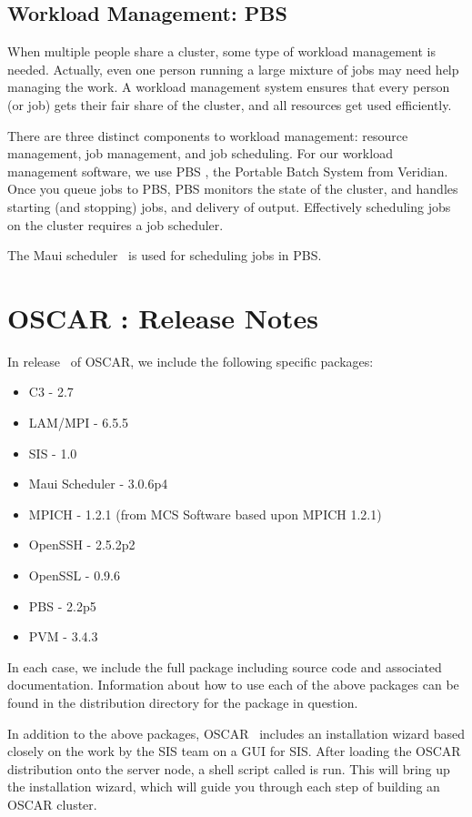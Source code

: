 \documentclass[letterpaper,11pt]{article}
\begin{document}
\subsection{Workload Management: PBS}
When multiple people share a cluster, some type of workload management
is needed.  Actually, even one person running a large mixture of jobs
may need help managing the work.  A workload management system ensures
that every person (or job) gets their fair share of the cluster, and
all resources get used efficiently.

There are three distinct components to workload management: resource
management, job management, and job scheduling.  For our workload
management software, we use PBS \cite{OpenPBS}, the Portable Batch System
from Veridian.  Once you queue jobs to PBS, PBS monitors the state of
the cluster, and handles starting (and stopping) jobs, and delivery of
output.  Effectively scheduling jobs on the cluster requires a job
scheduler.

The Maui scheduler~\cite{MAUI} is used for scheduling jobs in PBS.

\section{OSCAR \oscarversion: Release Notes}
In release \oscarversion\ of OSCAR, we include the following specific
packages:
\begin{itemize}
        \item C3 - 2.7
        \item LAM/MPI - 6.5.5
        \item SIS - 1.0
        \item Maui Scheduler - 3.0.6p4
        \item MPICH - 1.2.1 (from MCS Software based upon MPICH 1.2.1)
        \item OpenSSH - 2.5.2p2
        \item OpenSSL - 0.9.6
        \item PBS - 2.2p5
        \item PVM - 3.4.3
\end{itemize}

In each case, we include the full package including source code and
associated documentation.  Information about how to use each of the
above packages can be found in the distribution directory for the
package in question.

In addition to the above packages, OSCAR \oscarversion\ includes an
installation wizard based closely on the work by the SIS team on a GUI
for SIS.  After loading the OSCAR distribution onto the server node, a
shell script called  is run.  This will bring up
the installation wizard, which will guide you through each step of
building an OSCAR cluster.
\end{document}
